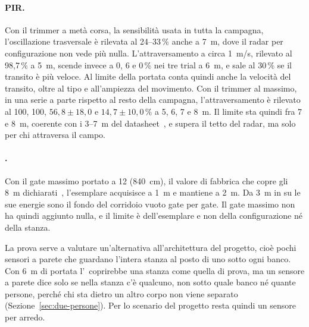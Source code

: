 \paragraph{PIR.} Con il trimmer a metà corsa, la sensibilità usata in tutta la campagna, l'oscillazione trasversale è rilevata al 24--33\,\% anche a 7~m, dove il radar per configurazione non vede più nulla. L'attraversamento a circa 1~m/s, rilevato al 98,7\,\% a 5~m, scende invece a 0, 6 e 0\,\% nei tre trial a 6~m, e sale al 30\,\% se il transito è più veloce. Al limite della portata conta quindi anche la velocità del transito, oltre al tipo e all'ampiezza del movimento. Con il trimmer al massimo, in una serie a parte rispetto al resto della campagna, l'attraversamento è rilevato al 100, 100, $56{,}8 \pm 18{,}0$ e $14{,}7 \pm 10{,}0\,\%$ a 5, 6, 7 e 8~m. Il limite sta quindi fra 7 e 8~m, coerente con i 3--7~m del datasheet~\cite{hcsr501}, e supera il tetto del radar, ma solo per chi attraversa il campo.

\paragraph{\ldc.} Con il gate massimo portato a 12 (840~cm), il valore di fabbrica
che copre gli 8~m dichiarati~\cite{hilinkManualLD2420}, l'esemplare acquisisce a 1~m e mantiene a 2~m. Da 3~m in
su le sue energie sono il fondo del corridoio vuoto gate per gate. Il gate massimo non
ha quindi aggiunto nulla, e il limite è dell'esemplare e non della configurazione né
della stanza.

La prova serve a valutare un'alternativa all'architettura del progetto, cioè pochi sensori a parete che guardano l'intera stanza al posto di uno sotto ogni banco. Con 6~m di portata l'\ldb\ coprirebbe una stanza come quella di prova, ma un sensore a parete dice solo se nella stanza c'è qualcuno, non sotto quale banco né quante persone, perché chi sta dietro un altro corpo non viene separato (Sezione~\ref{sec:due-persone}). Per lo scenario del progetto resta quindi un sensore per arredo.
